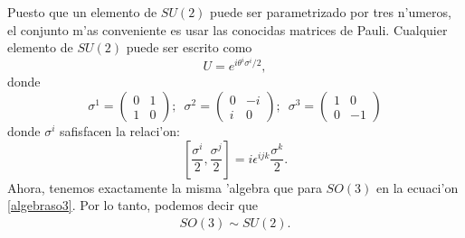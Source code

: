Puesto que un elemento de $SU(2)$ puede ser parametrizado por tres n'umeros, el conjunto m'as conveniente es usar las conocidas matrices de Pauli. Cualquier elemento de $SU(2)$ puede ser escrito como
\begin{equation}
U=e^{i\theta^i \sigma^i /2},
\end{equation}
donde
\begin{equation}
\sigma^{1}=\begin{pmatrix}0 & 1\\
1 & 0
\end{pmatrix};\,\,\,\sigma^{2}=\begin{pmatrix}0 & -i\\
i & 0
\end{pmatrix};\,\,\,\sigma^{3}=\begin{pmatrix}1 & 0\\
0 & -1
\end{pmatrix}
\end{equation}
donde $\sigma^i$ safisfacen la relaci'on:
\begin{equation}
\left[\frac{\sigma^i}{2},\frac{\sigma^j}{2}\right]=i\epsilon^{ijk}\frac{\sigma^k}{2}.
\end{equation}
Ahora, tenemos exactamente la misma 'algebra que para $SO(3)$ en la ecuaci'on \eqref{algebraso3}. Por lo tanto, podemos decir que
\begin{eqnarray}
SO(3) \sim SU(2).
\end{eqnarray}



